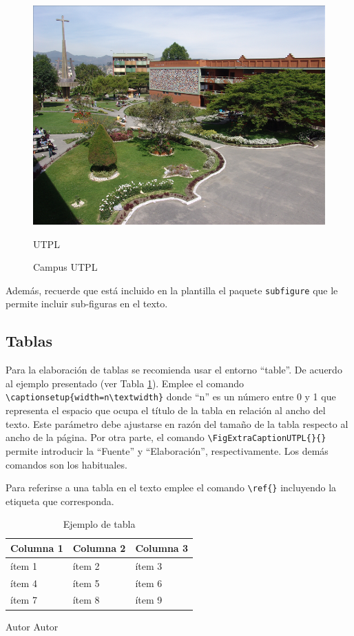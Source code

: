 \begin{figure}[h!]
	\centering
	\captionsetup{width=0.7\textwidth}
	\includegraphics[width=0.7\linewidth]{FIGURES/UTPL_cruz}
	\caption{Campus UTPL \vspace{-5pt}}
	\FigExtraCaptionUTPL 			%
		{\cite{utpl2008campus}}		%
		{UTPL}			%
	\label{fig:utplcruz}
\end{figure}

Además, recuerde que está incluido en la plantilla el paquete \texttt{subfigure} que le permite incluir sub-figuras en el texto. 

\subsection{Tablas}
Para la elaboración de tablas se recomienda usar el entorno ``table''. De acuerdo al ejemplo presentado (ver Tabla \ref{tb:Ejemplo}). Emplee el comando \lstinline|\captionsetup{width=n\textwidth}| donde ``n'' es un número entre 0 y 1 que representa el espacio que ocupa el título de la tabla en relación al ancho del texto. Este parámetro debe ajustarse en razón del tamaño de la tabla respecto al ancho de la página. Por otra parte, el comando \lstinline|\FigExtraCaptionUTPL{}{}| permite introducir la ``Fuente'' y ``Elaboración'', respectivamente. Los demás comandos son los habituales. 

Para referirse a una tabla en el texto emplee el comando \lstinline|\ref{}| incluyendo la etiqueta que corresponda. 

\begin{table}[]
	\centering
	\captionsetup{width=0.42\textwidth}
	\caption{Ejemplo de tabla}
	\label{tb:Ejemplo}
	\begin{tabular}{|l|l|l|}
		\hline
		\textbf{Columna 1} & \textbf{Columna 2} & \textbf{Columna 3} \\ \hline
		ítem 1             & ítem 2             & ítem 3             \\ \hline
		ítem 4             & ítem 5             & ítem 6             \\ \hline
		ítem 7             & ítem 8             & ítem 9             \\ \hline
	\end{tabular}
	\FigExtraCaptionUTPL		%
		{Autor}					%
		{Autor} 				%
\end{table}

